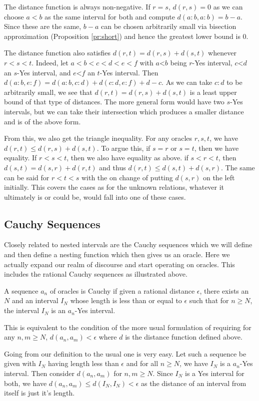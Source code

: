 \documentclass[12pt]{article}
\theoremstyle{remark}
\newcommand{\lt}{\mathord{<}}
\begin{document}
The distance function is always non-negative. If $r=s$, $d(r,s)=0$ as we can choose $a<b$ as the same interval for both and compute $d(a:b,a:b)= b-a$. Since these are the same, $b-a$ can be chosen arbitrarily small via bisection approximation (Proposition \ref{pr:short}) and hence the greatest lower bound is 0. 

The distance function also satisfies $d(r,t) = d(r,s) + d(s,t)$ whenever $r < s < t$. Indeed, let $a<b<c<d<e<f$ with $a\lt b$ being $r$-Yes interval, $c\lt d$ an $s$-Yes interval, and $e\lt f$ an $t$-Yes interval. Then $d(a:b, e:f) = d(a:b,c:d) +d(c:d,e:f) + d-c$. As we can take $c:d$ to be arbitrarily small, we see that $d(r,t) = d(r,s) + d(s,t)$ is a least upper bound of that type of distances. The more general form would have two $s$-Yes intervals, but we can take their intersection which produces a smaller distance and is of the above form. 

From this, we also get the triangle inequality. For any oracles $r, s, t$, we have $d(r,t) \leq d(r,s) + d(s,t)$.  To argue this, if $s = r$ or $s=t$, then we have equality. If $r < s< t$, then we also have equality as above. if $s < r < t$, then $d(s,t) = d(s,r) + d(r,t)$ and thus $d(r,t) \leq d(s,t) + d(s,r)$. The same can be said for $r < t < s$ with the on change of putting $d(s,r)$ on the left initially. This covers the cases as for the unknown relations, whatever it ultimately is or could be, would fall into one of these cases. 

\subsection{Cauchy Sequences}

Closely related to nested intervals are the Cauchy sequences which we will define and then define a nesting function which then gives us an oracle. Here we actually expand our realm of discourse and start operating on oracles. This includes the rational Cauchy sequences as illustrated above. 

A sequence $a_n$ of oracles is Cauchy if given a rational distance $\epsilon$, there exists an $N$ and an interval $I_N$ whose length is less than or equal to $\epsilon$ such that for $n \geq N$, the interval $I_N$ is an $a_n$-Yes interval. 

This is equivalent to the condition of the more usual formulation of requiring for any $n, m \geq N$, $d(a_n,  a_m) < \epsilon$ where $d$ is the distance function defined above. 

Going from our definition to the usual one is very easy. Let such a sequence be given with $I_N$ having length less than $\epsilon$ and for all $n \geq N$, we have $I_N$ is a $a_n$-Yes interval. Then consider $d(a_n, a_m)$ for $n, m \geq N$. Since $I_N$ is a Yes interval for both, we have $d(a_n, a_m) \leq d(I_N, I_N) < \epsilon$ as the distance of an interval from itself is just it's length. 
\end{document}

